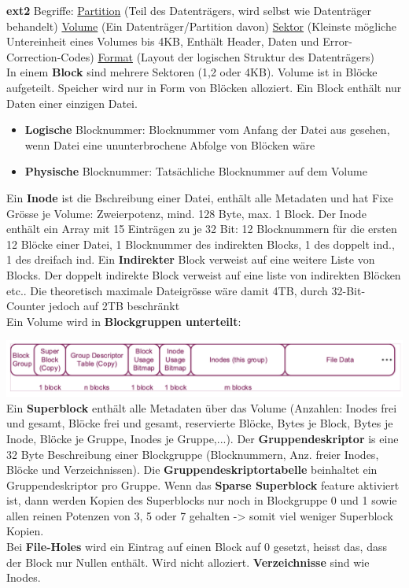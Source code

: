 \documentclass[8pt]{extarticle}
\let\oldtextbf\textbf
\renewcommand{\textbf}{\tiny\oldtextbf}
\begin{document}
\begin{multicols*}{5}
	\textbf{ext2} Begriffe: \underline{Partition} (Teil des Datenträgers, wird selbst wie Datenträger behandelt) \underline{Volume} (Ein Datenträger/Partition davon) \underline{Sektor} (Kleinste mögliche Untereinheit eines Volumes bis 4KB, Enthält Header, Daten und Error-Correction-Codes) \underline{Format} (Layout der logischen Struktur des Datenträgers)\\
	
	In einem \textbf{Block} sind mehrere Sektoren (1,2 oder 4KB). Volume ist in Blöcke aufgeteilt. Speicher wird nur in Form von Blöcken alloziert. Ein Block enthält nur Daten einer einzigen Datei.
	\begin{itemize} [noitemsep, topsep=0pt, leftmargin=*]
		\item \textbf{Logische} Blocknummer: Blocknummer vom Anfang der Datei aus gesehen, wenn Datei eine ununterbrochene Abfolge von Blöcken wäre
		\item \textbf{Physische} Blocknummer: Tatsächliche Blocknummer auf dem Volume
	\end{itemize}
	\vspace{5pt}
	Ein \textbf{Inode} ist die Bschreibung einer Datei, enthält alle Metadaten und hat Fixe Grösse je Volume: Zweierpotenz, mind. 128 Byte, max. 1 Block. Der Inode enthält ein Array mit 15 Einträgen zu je 32 Bit: 12 Blocknummern für die ersten 12 Blöcke einer Datei, 1 Blocknummer des indirekten Blocks, 1 des doppelt ind., 1 des dreifach ind. Ein \textbf{Indirekter} Block verweist auf eine weitere Liste von Blocks. Der doppelt indirekte Block verweist auf eine liste von indirekten Blöcken etc.. Die theoretisch maximale Dateigrösse wäre damit 4TB, durch 32-Bit-Counter jedoch auf 2TB beschränkt\\
	
	Ein Volume wird in \textbf{Blockgruppen unterteilt}:
	
	\includegraphics[scale=0.238]{Blockgruppe.png} Ein \textbf{Superblock} enthält alle Metadaten über das Volume (Anzahlen: Inodes frei und gesamt, Blöcke frei und gesamt, reservierte Blöcke, Bytes je Block, Bytes je Inode, Blöcke je Gruppe, Inodes je Gruppe,...). Der \textbf{Gruppendeskriptor} is eine 32 Byte Beschreibung einer Blockgruppe (Blocknummern, Anz. freier Inodes, Blöcke und Verzeichnissen). Die \textbf{Gruppendeskriptortabelle} beinhaltet ein Gruppendeskriptor pro Gruppe. Wenn das \textbf{Sparse Superblock} feature aktiviert ist, dann werden Kopien des Superblocks nur noch in Blockgruppe 0 und 1 sowie allen reinen Potenzen von 3, 5 oder 7 gehalten -> somit viel weniger Superblock Kopien.\\
	Bei \textbf{File-Holes} wird ein Eintrag auf einen Block auf 0 gesetzt, heisst das, dass der Block nur Nullen enthält. Wird nicht alloziert. \textbf{Verzeichnisse} sind wie Inodes.
	

\end{multicols*}
\end{document}
